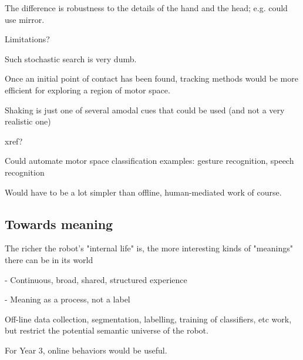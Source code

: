 The difference is robustness to the details of the hand and the head; e.g. could use mirror.

Limitations?

Such stochastic search is very dumb.

Once an initial point of contact has been found, tracking methods would be more efficient for exploring a region of motor space.

Shaking is just one of several amodal cues that could be used (and not a very realistic one)

xref?

Could automate motor space classification examples: gesture recognition, speech recognition

Would have to be a lot simpler than offline, human-mediated work of course.


\subsection{Towards meaning}

The richer the robot's "internal life" is, the more interesting kinds
of "meanings" there can be in its world

- Continuous, broad, shared, structured experience

- Meaning as a process, not a label

Off-line data collection, segmentation, labelling, training of
classifiers, etc work, but restrict the potential semantic universe of
the robot.

For Year 3, online behaviors would be useful.

